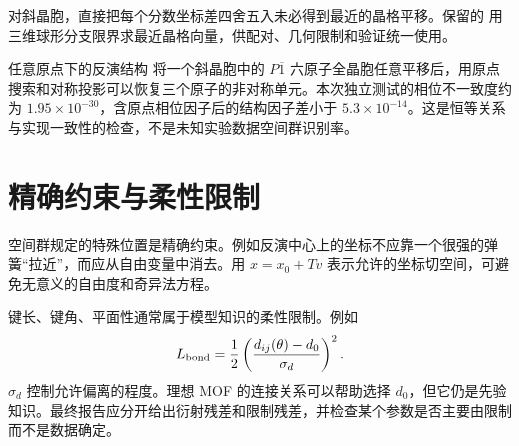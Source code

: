 对斜晶胞，直接把每个分数坐标差四舍五入未必得到最近的晶格平移。保留的  用三维球形分支限界求最近晶格向量，供配对、几何限制和验证统一使用。

\begin{worked}{任意原点下的反演结构}
将一个斜晶胞中的 $P\overline1$ 六原子全晶胞任意平移后，用原点搜索和对称投影可以恢复三个原子的非对称单元。本次独立测试的相位不一致度约为 $1.95\times10^{-30}$，含原点相位因子后的结构因子差小于 $5.3\times10^{-14}$。这是恒等关系与实现一致性的检查，不是未知实验数据空间群识别率。
\end{worked}

\section{精确约束与柔性限制}
空间群规定的特殊位置是精确约束。例如反演中心上的坐标不应靠一个很强的弹簧“拉近”，而应从自由变量中消去。用 $x=x_0+Tv$ 表示允许的坐标切空间，可避免无意义的自由度和奇异法方程。

键长、键角、平面性通常属于模型知识的柔性限制。例如
\begin{equation}
 L_{\rm bond}=\frac12\left(\frac{d_{ij}(\theta)-d_0}{\sigma_d}\right)^2.
\end{equation}
$\sigma_d$ 控制允许偏离的程度。理想 MOF 的连接关系可以帮助选择 $d_0$，但它仍是先验知识。最终报告应分开给出衍射残差和限制残差，并检查某个参数是否主要由限制而不是数据确定。
